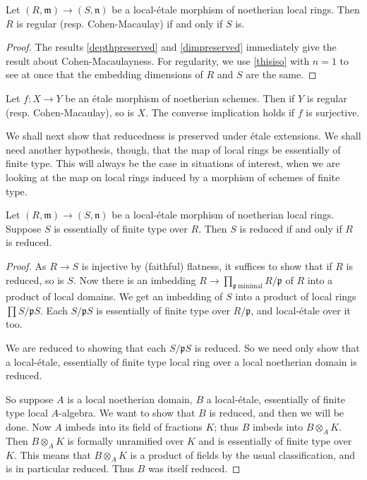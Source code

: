 \begin{corollary} 
Let $(R, \mathfrak{m}) \to (S, \mathfrak{n})$ be a local-\'etale morphism of noetherian local
rings. 
Then $R$ is regular (resp. Cohen-Macaulay) if and only if $S$ is.
\end{corollary} 
\begin{proof} 
The  results \cref{depthpreserved} and \cref{dimpreserved} immediately give
the result about Cohen-Macaulayness.
For regularity, we use \eqref{thisiso} with $n=1$ to see at once that the
embedding dimensions of $R$ and $S$ are the same.
\end{proof} 


\begin{corollary} 
Let $f: X \to Y$ be an \'etale morphism of noetherian schemes. Then if $Y$ is
regular (resp. Cohen-Macaulay), so is $X$. The converse implication holds if
$f$ is surjective.
\end{corollary} 


We shall next show that reducedness is preserved
under \'etale extensions.
We shall need another hypothesis, though, that the map of local rings 
be essentially of finite type.
This will always be the case in situations of interest, when we are looking at
the map on local rings induced by a morphism of schemes of finite type.

\begin{proposition} 
Let $(R, \mathfrak{m}) \to (S, \mathfrak{n})$ be a local-\'etale morphism of noetherian local
rings. 
Suppose $S$ is essentially of finite type over $R$.
Then $S$ is reduced if and only if $R$ is reduced.
\end{proposition} 
\begin{proof} 
As $R \to S$ is injective by (faithful) flatness, it suffices to show that if
$R$ is reduced, so is $S$.
Now there is an imbedding $R \to \prod_{\mathfrak{p} \ \mathrm{minimal}}
R/\mathfrak{p}$ of $R$ into a product of local domains. We get an imbedding of
$S$ into a product of local rings $\prod S/\mathfrak{p}S$.
Each $S/\mathfrak{p}S$ is essentially of finite type over $R/\mathfrak{p}$,
and local-\'etale over it too.

We are reduced to showing that each $S/\mathfrak{p}S$ is reduced. So we need
only show that a local-\'etale, essentially of finite type local ring over a
local noetherian domain is reduced. 

So suppose $A$ is a local noetherian domain, $B$ a 
local-\'etale, essentially of finite type local $A$-algebra.
We want to show that $B$ is reduced, and then we will be done. Now $A$ imbeds into its field of
fractions $K$; thus $B$ imbeds into $B \otimes_A K$. 
Then $B \otimes_A K$ is formally unramified over $K$ and is essentially of
finite type over $K$. This means that $B \otimes_A K$ is a product of fields
by the usual classification, and is in particular reduced. Thus $B$ was itself
reduced.
\end{proof} 


